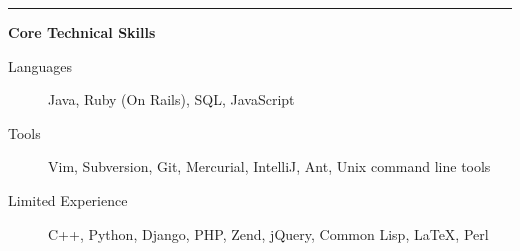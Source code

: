 \documentclass[10pt,letterpaper]{article}
\newenvironment{indentsection}[1]%
{\begin{list}{}%
	{\setlength{\leftmargin}{#1}}%
	\item[]%
}
{\end{list}}
\begin{document}
\vspace{0.1in}
\hrule
\vspace{0.2in}
{\large \textbf{Core Technical Skills}}
\begin{indentsection}{\parindent}
\begin{description}
	\item[Languages]
	Java, Ruby (On Rails), SQL, JavaScript
	\item[Tools]
	Vim, Subversion, Git, Mercurial, IntelliJ, Ant, Unix command line tools
	\item[Limited Experience]
	C++, Python, Django, PHP, Zend, jQuery, Common Lisp, \LaTeX, Perl
\end{description}
\end{indentsection}
\end{document}
